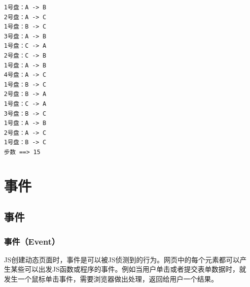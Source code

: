 \begin{tcolorbox}
	\begin{verbatim}
1号盘：A -> B
2号盘：A -> C
1号盘：B -> C
3号盘：A -> B
1号盘：C -> A
2号盘：C -> B
1号盘：A -> B
4号盘：A -> C
1号盘：B -> C
2号盘：B -> A
1号盘：C -> A
3号盘：B -> C
1号盘：A -> B
2号盘：A -> C
1号盘：B -> C
步数 ==> 15
	\end{verbatim}
\end{tcolorbox}

\newpage

\chapter{事件}

\section{事件}

\subsection{事件（Event）}

JS创建动态页面时，事件是可以被JS侦测到的行为。网页中的每个元素都可以产生某些可以出发JS函数或程序的事件。例如当用户单击或者提交表单数据时，就发生一个鼠标单击事件，需要浏览器做出处理，返回给用户一个结果。

\begin{table}[H]
	\centering
\end{table}

